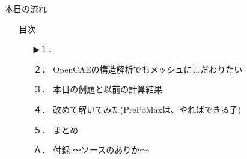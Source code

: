 \begin{frame}{本日の流れ}
  \begin{itemize}
     \item[] 目次
     \begin{itemize}[itemsep=1.3ex, leftmargin=1cm]
        \item[▶１．] 
        \item[２．] OpenCAEの構造解析でもメッシュにこだわりたい
        \item[３．] 本日の例題と以前の計算結果
        \item[４．] 改めて解いてみた(PrePoMaxは、やればできる子)
        \item[５．] まとめ
        \item[Ａ．] 付録 ～ソースのありか～
     \end{itemize}
  \end{itemize}
\end{frame}
